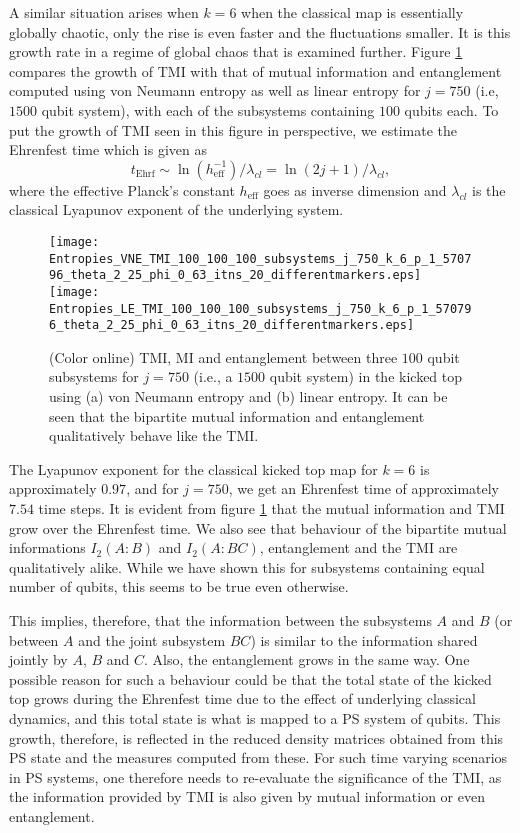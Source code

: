 \documentclass[pre,aps,showpacs,showkeys,twocolumn]{revtex4-1}
\theoremstyle{definition}
\theoremstyle{remark}
\begin{document}
A similar situation arises when $k = 6$ when the classical map is essentially globally chaotic, only the rise is even faster and the fluctuations smaller. It is this growth rate in a regime of global chaos that is examined further. Figure \ref{fig:tmi_initial_time_growth} compares the growth of TMI with that of mutual information and entanglement computed using von Neumann entropy as well as linear entropy for $j = 750$ (i.e, $1500$ qubit system), with each of the subsystems containing $100$ qubits each. To put the growth of TMI seen in this figure in perspective, we estimate the Ehrenfest time which is given as 
\begin{equation}
    t_{\text{Ehrf}} \sim \ln\left(h_{\text{eff}}^{-1}\right)/ \lambda_{cl} =\ln(2j+1)/\lambda_{cl},
\end{equation}
where the effective Planck's constant $h_{\text{eff}}$ goes as inverse dimension and $\lambda_{cl}$ is the classical Lyapunov exponent of the underlying system. 

\begin{figure}[!htpb]
    \texttt{[image: Entropies\_VNE\_TMI\_100\_100\_100\_subsystems\_j\_750\_k\_6\_p\_1\_570796\_theta\_2\_25\_phi\_0\_63\_itns\_20\_differentmarkers.eps]}
    \\
    \texttt{[image: Entropies\_LE\_TMI\_100\_100\_100\_subsystems\_j\_750\_k\_6\_p\_1\_570796\_theta\_2\_25\_phi\_0\_63\_itns\_20\_differentmarkers.eps]}
    
    \caption{(Color online) TMI, MI and entanglement between three $100$ qubit subsystems for $j = 750$ (i.e., a $1500$ qubit system) in the kicked top using (a) von Neumann entropy and (b) linear entropy. It can be seen that the bipartite mutual information and entanglement qualitatively behave like the TMI.}
    \label{fig:tmi_initial_time_growth}
\end{figure}

The Lyapunov exponent for the classical kicked top map for $k = 6$ is approximately $0.97$, and for $j = 750$, we get an Ehrenfest time of approximately $7.54$ time steps. It is evident from figure \ref{fig:tmi_initial_time_growth} that the mutual information and TMI grow over the Ehrenfest time. 
We also see that behaviour of the bipartite mutual informations $I_2(A: B)$ and $I_2(A: BC)$, entanglement and the TMI are qualitatively alike. While we have shown this for subsystems containing equal number of qubits, this seems to be true even otherwise.

This implies, therefore, that the information between the subsystems $A$ and $B$ (or between $A$ and the joint subsystem $BC$) is similar to the information shared jointly by $A$, $B$ and $C$. Also, the entanglement grows in the same way. One possible reason for such a behaviour could be that the total state of the kicked top grows during the Ehrenfest time due to the effect of underlying classical dynamics, and this total state is what is mapped to a PS system of qubits. This growth, therefore, is reflected in the reduced density matrices obtained from this PS state and the measures computed from these. For such time varying scenarios in PS systems, one therefore needs to re-evaluate the significance of the TMI, as the information provided by TMI is also given by mutual information or even entanglement.
\end{document}
